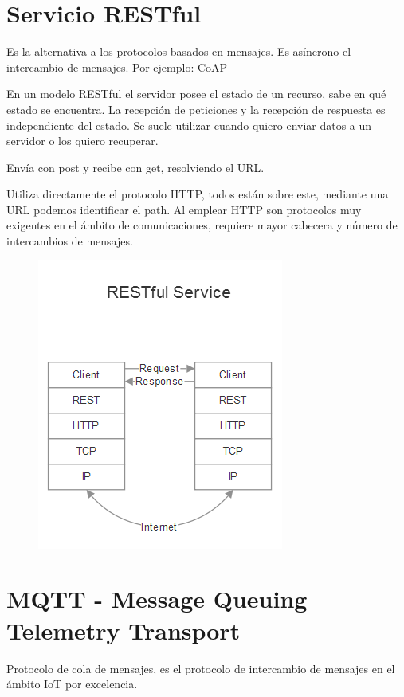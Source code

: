 \documentclass[12pt, twoside, openright]{report} %
\begin{document}
\newpage

\section{Servicio RESTful}

Es la alternativa a los protocolos basados en mensajes. Es asíncrono el intercambio de mensajes. Por ejemplo: CoAP

En un modelo RESTful el servidor posee el estado de un recurso, sabe en qué estado se encuentra.
La recepción de peticiones y la recepción de respuesta es independiente del estado. Se suele utilizar cuando quiero enviar datos a un servidor o los quiero recuperar.

Envía con post y recibe con get, resolviendo el URL.

Utiliza directamente el protocolo HTTP, todos están sobre este, mediante una URL podemos identificar el path.
Al emplear HTTP son protocolos muy exigentes en el ámbito de comunicaciones, requiere mayor cabecera y número de intercambios de mensajes.

\begin{figure}[H]
	{\includegraphics[scale=.7]{2021-04-08 09_36_12-2021-04-07 17-01-12.mkv.png}}
\end{figure}

\section{MQTT - Message Queuing Telemetry Transport}
Protocolo de cola de mensajes, es el protocolo de intercambio de mensajes en el ámbito IoT por excelencia.
\end{document}
